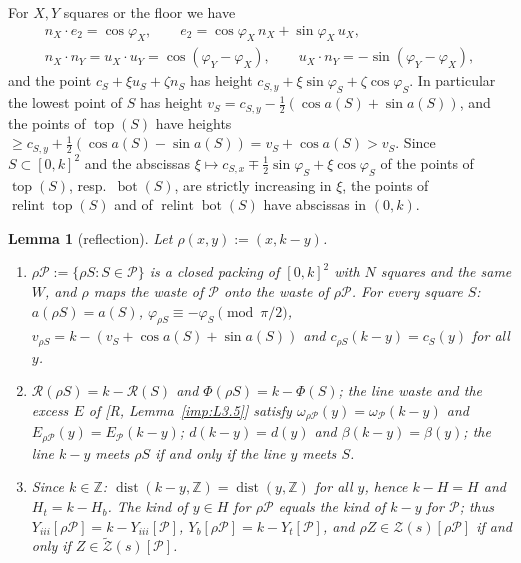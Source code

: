 \documentclass[11pt]{amsart}
\newcommand{\Z}{\mathbb Z}
\newcommand{\relint}{\operatorname{relint}}
\newcommand{\Bot}{\operatorname{bot}}
\newcommand{\Top}{\operatorname{top}}
\newcommand{\dist}{\operatorname{dist}}
\newtheorem{lemma}[theorem]{Lemma}
\theoremstyle{definition}
\theoremstyle{remark}
\numberwithin{equation}{section}
\begin{document}
For $X,Y$ squares or the floor we have
\begin{equation}\label{eq:flows-frame}
\begin{gathered}
n_X\cdot e_2=\cos\varphi_X,\qquad e_2=\cos\varphi_X\,n_X+\sin\varphi_X\,u_X,\\
n_X\cdot n_Y=u_X\cdot u_Y=\cos(\varphi_Y-\varphi_X),\qquad u_X\cdot n_Y=-\sin(\varphi_Y-\varphi_X),
\end{gathered}
\end{equation}
and the point $c_S+\xi u_S+\zeta n_S$ has height $c_{S,y}+\xi\sin\varphi_S+\zeta\cos\varphi_S$. In particular the
lowest point of $S$ has height $v_S=c_{S,y}-\frac12(\cos a(S)+\sin a(S))$, and the points of $\Top(S)$ have heights
$\ge c_{S,y}+\frac12(\cos a(S)-\sin a(S))=v_S+\cos a(S)>v_S$. Since $S\subset[0,k]^2$ and the abscissas
$\xi\mapsto c_{S,x}\mp\frac12\sin\varphi_S+\xi\cos\varphi_S$ of the points of $\Top(S)$, resp.\ $\Bot(S)$, are strictly
increasing in $\xi$, the points of $\relint\Top(S)$ and of $\relint\Bot(S)$ have abscissas in $(0,k)$.

\begin{lemma}[reflection]\label{lem:flows-refl}
Let $\rho(x,y):=(x,k-y)$.
\begin{enumerate}[label=(\alph*)]
\item $\rho\mathcal P:=\{\rho S:S\in\mathcal P\}$ is a closed packing of $[0,k]^2$ with $N$ squares and the same $W$, and
$\rho$ maps the waste of $\mathcal P$ onto the waste of $\rho\mathcal P$. For every square $S$:
$a(\rho S)=a(S)$, $\varphi_{\rho S}\equiv-\varphi_S\pmod{\pi/2}$, $v_{\rho S}=k-(v_S+\cos a(S)+\sin a(S))$ and
$c_{\rho S}(k-y)=c_S(y)$ for all $y$.
\item $\mathcal R(\rho S)=k-\mathcal R(S)$ and $\Phi(\rho S)=k-\Phi(S)$; the line waste and the excess $E$ of
[R, Lemma~\ref{imp:L3.5}] satisfy $\omega_{\rho\mathcal P}(y)=\omega_{\mathcal P}(k-y)$ and
$E_{\rho\mathcal P}(y)=E_{\mathcal P}(k-y)$; $d(k-y)=d(y)$ and $\beta(k-y)=\beta(y)$; the line $k-y$ meets $\rho S$ if and
only if the line $y$ meets $S$.
\item Since $k\in\Z$: $\dist(k-y,\Z)=\dist(y,\Z)$ for all $y$, hence $k-H=H$ and $H_t=k-H_b$. The kind of $y\in H$ for
$\rho\mathcal P$ equals the kind of $k-y$ for $\mathcal P$; thus $Y_{iii}[\rho\mathcal P]=k-Y_{iii}[\mathcal P]$,
$Y_b[\rho\mathcal P]=k-Y_t[\mathcal P]$, and $\rho Z\in\mathcal Z(s)[\rho\mathcal P]$ if and only if
$Z\in\tilde{\mathcal Z}(s)[\mathcal P]$.
\end{enumerate}
\end{lemma}
\end{document}
